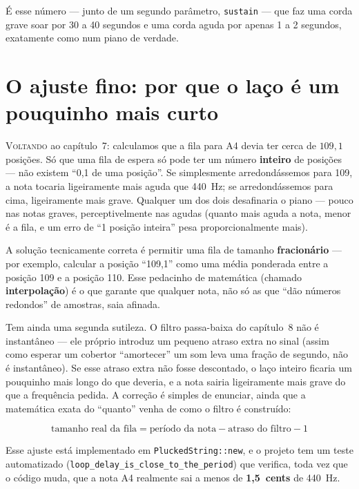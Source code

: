 \documentclass[11pt,oneside]{book}
\newcommand{\opening}[2]{\lettrine[lines=2,loversize=0.08,lraise=0.02]{#1}{#2}}
\begin{document}
É esse número --- junto de um segundo parâmetro, \texttt{sustain} --- que
faz uma corda grave soar por 30 a 40 segundos e uma corda aguda por apenas
1 a 2 segundos, exatamente como num piano de verdade.

\chapter{O ajuste fino: por que o laço é um pouquinho mais curto}

\opening{V}{oltando} ao capítulo~7: calculamos que a fila para A4 devia ter
cerca de $109{,}1$ posições. Só que uma fila de espera só pode ter um
número \textbf{inteiro} de posições --- não existem \enquote{0,1 de uma
posição}. Se simplesmente arredondássemos para 109, a nota tocaria
ligeiramente mais aguda que 440~Hz; se arredondássemos para cima,
ligeiramente mais grave. Qualquer um dos dois desafinaria o piano --- pouco
nas notas graves, perceptivelmente nas agudas (quanto mais aguda a nota,
menor é a fila, e um erro de \enquote{1 posição inteira} pesa
proporcionalmente mais).

A solução tecnicamente correta é permitir uma fila de tamanho
\textbf{fracionário} --- por exemplo, calcular a posição \enquote{109,1}
como uma média ponderada entre a posição 109 e a posição 110. Esse
pedacinho de matemática (chamado \textbf{interpolação}) é o que garante que
qualquer nota, não só as que \enquote{dão números redondos} de amostras,
saia afinada.

Tem ainda uma segunda sutileza. O filtro passa-baixa do capítulo~8 não é
instantâneo --- ele próprio introduz um pequeno atraso extra no sinal
(assim como esperar um cobertor \enquote{amortecer} um som leva uma fração
de segundo, não é instantâneo). Se esse atraso extra não fosse descontado,
o laço inteiro ficaria um pouquinho mais longo do que deveria, e a nota
sairia ligeiramente mais grave do que a frequência pedida. A correção é
simples de enunciar, ainda que a matemática exata do \enquote{quanto} venha
de como o filtro é construído:

\[
\text{tamanho real da fila} = \text{período da nota} - \text{atraso do filtro} - 1
\]

Esse ajuste está implementado em \texttt{PluckedString::new}, e o projeto
tem um teste automatizado
(\texttt{loop\_delay\_is\_close\_to\_the\_period}) que verifica, toda vez
que o código muda, que a nota A4 realmente sai a menos de
\textbf{1,5~cents} de 440~Hz.
\end{document}
